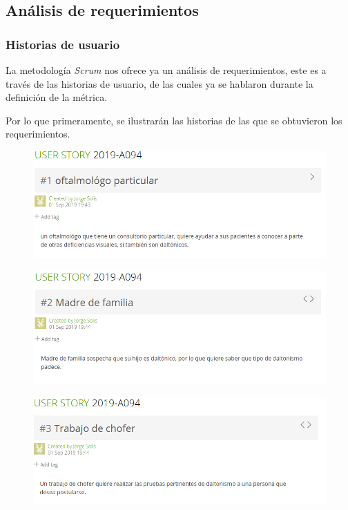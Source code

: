 \documentclass[10pt]{article}
\begin{document}
\subsection{Análisis de requerimientos}
\subsubsection{Historias de usuario}
La metodología \textit{Scrum} nos ofrece ya un análisis de requerimientos, este es a través de las historias de usuario, de las cuales ya se hablaron durante la definición de la métrica.

Por lo que primeramente, se ilustrarán las historias de las que se obtuvieron los requerimientos.

\begin{figure}[H]
	\begin{center}
\includegraphics[scale = .55]{HS/US1.png}
	\end{center} 
\end{figure}


\begin{figure}[H]
	\begin{center}
\includegraphics[scale = 0.55]{HS/US2.png}
	\end{center} 
\end{figure}

\begin{figure}[H]
	\begin{center}
\includegraphics[scale = 0.55]{HS/US3.png}
	\end{center} 
\end{figure}
\end{document}
